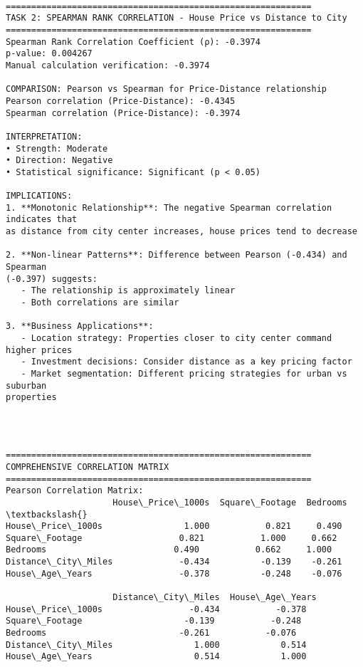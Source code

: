 \documentclass[11pt]{article}
\begin{document}
    \begin{Verbatim}[commandchars=\\\{\}]

============================================================
TASK 2: SPEARMAN RANK CORRELATION - House Price vs Distance to City
============================================================
Spearman Rank Correlation Coefficient (ρ): -0.3974
p-value: 0.004267
Manual calculation verification: -0.3974

COMPARISON: Pearson vs Spearman for Price-Distance relationship
Pearson correlation (Price-Distance): -0.4345
Spearman correlation (Price-Distance): -0.3974

INTERPRETATION:
• Strength: Moderate
• Direction: Negative
• Statistical significance: Significant (p < 0.05)

IMPLICATIONS:
1. **Monotonic Relationship**: The negative Spearman correlation indicates that
as distance from city center increases, house prices tend to decrease

2. **Non-linear Patterns**: Difference between Pearson (-0.434) and Spearman
(-0.397) suggests:
   - The relationship is approximately linear
   - Both correlations are similar

3. **Business Applications**:
   - Location strategy: Properties closer to city center command higher prices
   - Investment decisions: Consider distance as a key pricing factor
   - Market segmentation: Different pricing strategies for urban vs suburban
properties
    \end{Verbatim}

    \begin{center}
    \end{center}
    { \hspace*{\fill} \\}

    \begin{Verbatim}[commandchars=\\\{\}]

============================================================
COMPREHENSIVE CORRELATION MATRIX
============================================================
Pearson Correlation Matrix:
                     House\_Price\_1000s  Square\_Footage  Bedrooms  \textbackslash{}
House\_Price\_1000s                1.000           0.821     0.490
Square\_Footage                   0.821           1.000     0.662
Bedrooms                         0.490           0.662     1.000
Distance\_City\_Miles             -0.434          -0.139    -0.261
House\_Age\_Years                 -0.378          -0.248    -0.076

                     Distance\_City\_Miles  House\_Age\_Years
House\_Price\_1000s                 -0.434           -0.378
Square\_Footage                    -0.139           -0.248
Bedrooms                          -0.261           -0.076
Distance\_City\_Miles                1.000            0.514
House\_Age\_Years                    0.514            1.000
    \end{Verbatim}
\end{document}
